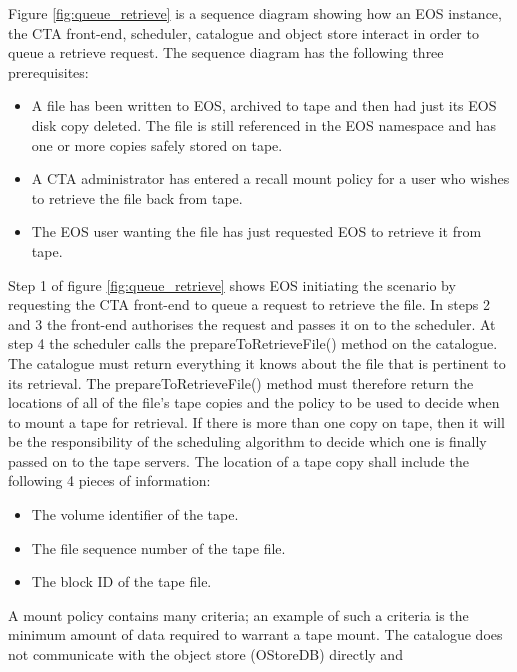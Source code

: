 \documentclass[10pt,a4paper]{article}
\begin{document}
Figure \ref{fig:queue_retrieve} is a sequence diagram showing how an EOS instance, the CTA front-end, scheduler,
catalogue and object store interact in order to queue a retrieve request.  The sequence diagram has the following
three prerequisites: \begin{itemize}
  \item A file has been written to EOS, archived to tape and then had just its EOS disk copy deleted.  The file is
  still referenced in the EOS namespace and has one or more copies safely stored on tape.  \item A CTA administrator
  has entered a recall mount policy for a user who wishes to retrieve the file back from tape.  \item The EOS user
  wanting the file has just requested EOS to retrieve it from tape.
\end{itemize} Step 1 of figure \ref{fig:queue_retrieve} shows EOS initiating the scenario by requesting the
CTA front-end to queue a request to retrieve the file.  In steps 2 and 3 the front-end authorises the request
and passes it on to the scheduler.  At step 4 the scheduler calls the prepareToRetrieveFile() method on the
catalogue.  The catalogue must return everything it knows about the file that is pertinent to its retrieval.
The prepareToRetrieveFile() method must therefore return the locations of all of the file's tape copies and the
policy to be used to decide when to mount a tape for retrieval.  If there is more than one copy on tape, then it
will be the responsibility of the scheduling algorithm to decide which one is finally passed on to the tape servers.
The location of a tape copy shall include the following 4 pieces of information: \begin{itemize}
  \item The volume identifier of the tape.  \item The file sequence number of the tape file.  \item The block ID
  of the tape file.
\end{itemize} A mount policy contains many criteria; an example of such a criteria is the minimum amount of data
required to warrant a tape mount.  The catalogue does not communicate with the object store (OStoreDB) directly and
\end{document}
